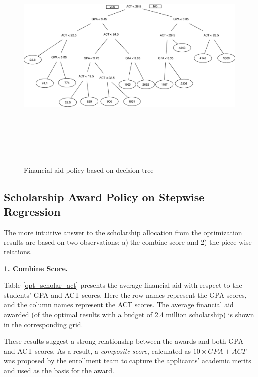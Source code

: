 \documentclass[12pt,english]{report}
\begin{document}
\begin{figure}
\includegraphics[width=6.5in, height=4.5in]{pic/FA_DT_Result.eps}%
\caption{Financial aid policy based on decision tree }
\label{FApolicybyDT}
\end{figure}
 
\subsection{Scholarship Award Policy on Stepwise Regression}
The more intuitive answer to the scholarship allocation from the optimization results are based on two observations; a) the combine score and 2) the piece wise relations.  

\vspace{0.1in}
\noindent \textbf{1. Combine Score.} 

\noindent Table \ref{opt_scholar_act} presents the average financial aid with respect to the students' GPA and ACT scores. Here the row names represent the GPA scores, and the column names represent the ACT scores. The average financial aid awarded (of the optimal results with a budget of 2.4 million scholarship) is shown in the corresponding grid.

These results suggest a strong relationship between the awards and both GPA and ACT scores. As a result, a \textit{composite score}, calculated as $10\times GPA + ACT $ was proposed by the enrollment team to capture the applicants' academic merits and used as the basis for the award.
\end{document}
